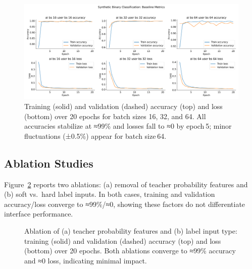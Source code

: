 \documentclass{article} %
\begin{document}
\begin{figure}[t]
  \centering
  \includegraphics[width=\textwidth]{baseline_metrics.png}
  \caption{Training (solid) and validation (dashed) accuracy (top) and loss (bottom) over 20 epochs for batch sizes 16, 32, and 64. All accuracies stabilize at ≈99\% and losses fall to ≈0 by epoch 5; minor fluctuations (±0.5\%) appear for batch size 64.}
  \label{fig:baseline}
\end{figure}

\subsection{Ablation Studies}
Figure~\ref{fig:ablations} reports two ablations: (a) removal of teacher probability features and (b) soft vs.~hard label inputs. In both cases, training and validation accuracy/loss converge to ≈99\%/≈0, showing these factors do not differentiate interface performance.

\begin{figure}[t]
  \centering
  \hfill
  \caption{Ablation of (a) teacher probability features and (b) label input type: training (solid) and validation (dashed) accuracy (top) and loss (bottom) over 20 epochs. Both ablations converge to ≈99\% accuracy and ≈0 loss, indicating minimal impact.}
  \label{fig:ablations}
\end{figure}
\end{document}
